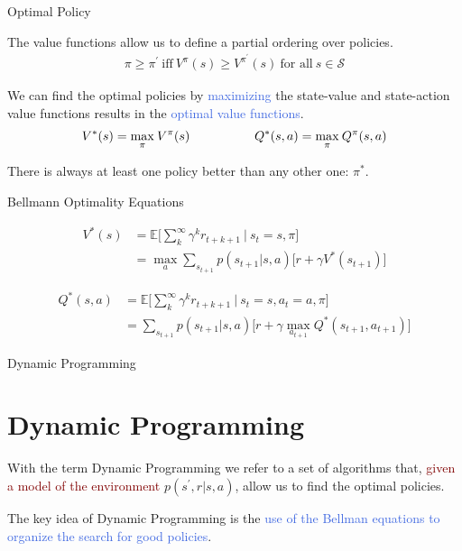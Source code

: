 \documentclass{beamer}
\begin{document}
\begin{frame}{Optimal Policy}

The value functions allow us to define a partial ordering over policies. 
	\begin{align*}
		\pi \geq \pi^{\prime}\: \text{iff}\: V^{\pi}(s) \geq V^{\pi^{'}}(s) \: \text{for all}\: s\in\mathcal{S}
	\end{align*}
	
	We can find the optimal policies by \textcolor{RoyalBlue}{maximizing} the state-value and state-action value functions results in the \textcolor{RoyalBlue}{optimal value functions}.
	\begin{align*}
	V^{*}(s)=\underset{\pi}{\max}\:V^{\pi}(s) \hspace{18mm} Q^{*}(s,a)= \underset{\pi}{\max}\:Q^{\pi}(s,a)
	\end{align*}

There is always at least one policy better than any other one: $\pi^{*}$.

\end{frame}

\begin{frame}{Bellmann Optimality Equations}

   \begin{align*}
	V^{*}(s)& = \mathds{E} \bigg[\sum_{k}^{\infty}\gamma^{k} r_{t+k+1} \: \bigg| \: s_t=s,\pi \bigg] \\
		   & = \max_a \sum_{s_{t+1}} p(s_{t+1}|s,a)\big[r + \gamma V^{*}(s_{t+1}) \big] 
	\end{align*}
	
	   \begin{align*}
	Q^{*}(s,a)& = \mathds{E} \bigg[\sum_{k}^{\infty}\gamma^{k} r_{t+k+1} \: \bigg| \: s_t=s, a_t=a,\pi \bigg] \\
		   & = \sum_{s_{t+1}} p(s_{t+1}|s,a)\big[r + \gamma \max_{a_{t+1}}Q^{*}(s_{t+1}, a_{t+1}) \big] 
	\end{align*}

\end{frame}



\begin{frame}{Dynamic Programming}
\section{Dynamic Programming}

With the term Dynamic Programming we refer to a set of algorithms that, \textcolor{Maroon}{given a model of the environment} $p(s^{\prime}, r| s, a)$, allow us to find the optimal policies.

\vspace{3mm}

The key idea of Dynamic Programming is the \textcolor{RoyalBlue}{use of the Bellman equations to organize the search for good policies}.

\end{frame}
\end{document}
